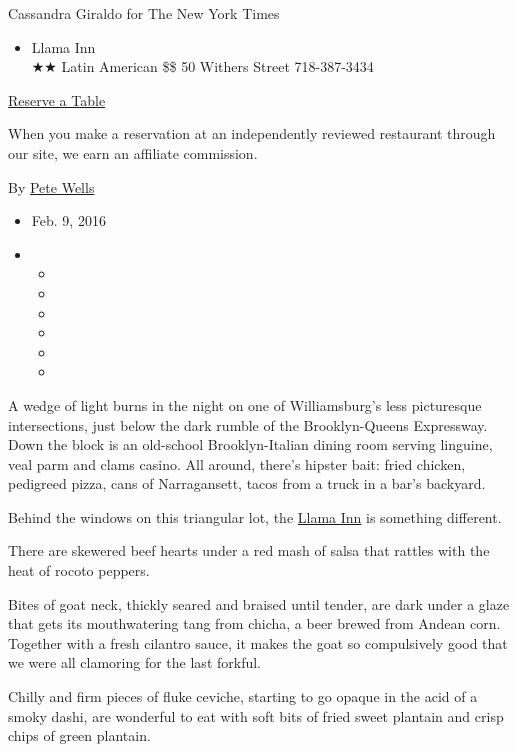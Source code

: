 Cassandra Giraldo for The New York Times

\begin{itemize}
\tightlist
\item
  Llama Inn\\
  ★★ Latin American \$\$ 50 Withers Street 718-387-3434
\end{itemize}

\href{https://resy.com/cities/ny/llama-inn?utm_source=nyt\&utm_medium=restoprofile\&utm_campaign=affiliates\&aff_id=c1fe784}{Reserve
a Table}

When you make a reservation at an independently reviewed restaurant
through our site, we earn an affiliate commission.

By \href{http://www.nytimes3xbfgragh.onion/by/pete-wells}{Pete Wells}

\begin{itemize}
\item
  Feb. 9, 2016
\item
  \begin{itemize}
  \item
  \item
  \item
  \item
  \item
  \item
  \end{itemize}
\end{itemize}

A wedge of light burns in the night on one of Williamsburg's less
picturesque intersections, just below the dark rumble of the
Brooklyn-Queens Expressway. Down the block is an old-school
Brooklyn-Italian dining room serving linguine, veal parm and clams
casino. All around, there's hipster bait: fried chicken, pedigreed
pizza, cans of Narragansett, tacos from a truck in a bar's backyard.

Behind the windows on this triangular lot, the
\href{http://www.llamainnnyc.com/}{Llama Inn} is something different.

There are skewered beef hearts under a red mash of salsa that rattles
with the heat of rocoto peppers.

Bites of goat neck, thickly seared and braised until tender, are dark
under a glaze that gets its mouthwatering tang from chicha, a beer
brewed from Andean corn. Together with a fresh cilantro sauce, it makes
the goat so compulsively good that we were all clamoring for the last
forkful.

Chilly and firm pieces of fluke ceviche, starting to go opaque in the
acid of a smoky dashi, are wonderful to eat with soft bits of fried
sweet plantain and crisp chips of green plantain.

